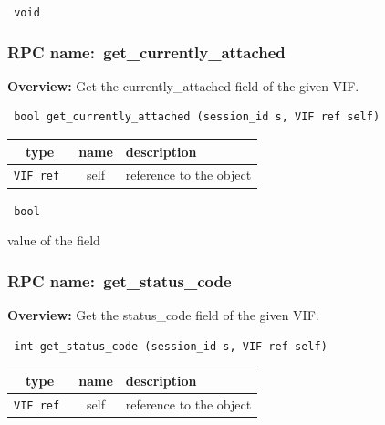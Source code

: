 \vspace{0.3cm}

{\tt 
void
}



\vspace{0.3cm}
\vspace{0.3cm}
\vspace{0.3cm}
\subsubsection{RPC name:~get\_currently\_attached}

{\bf Overview:} 
Get the currently\_attached field of the given VIF.

\begin{verbatim} bool get_currently_attached (session_id s, VIF ref self)\end{verbatim}



 
\vspace{0.3cm}
\begin{tabular}{|c|c|p{7cm}|}
 \hline
{\bf type} & {\bf name} & {\bf description} \\ \hline
{\tt VIF ref } & self & reference to the object \\ \hline 

\end{tabular}

\vspace{0.3cm}

{\tt 
bool
}


value of the field
\vspace{0.3cm}
\vspace{0.3cm}
\vspace{0.3cm}
\subsubsection{RPC name:~get\_status\_code}

{\bf Overview:} 
Get the status\_code field of the given VIF.

\begin{verbatim} int get_status_code (session_id s, VIF ref self)\end{verbatim}



 
\vspace{0.3cm}
\begin{tabular}{|c|c|p{7cm}|}
 \hline
{\bf type} & {\bf name} & {\bf description} \\ \hline
{\tt VIF ref } & self & reference to the object \\ \hline 

\end{tabular}

